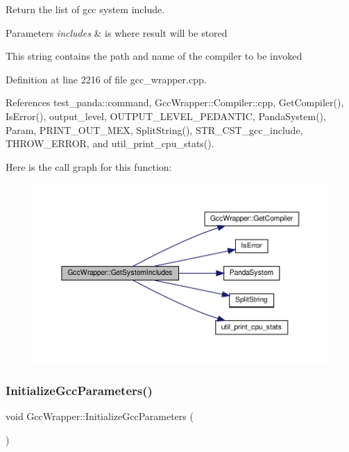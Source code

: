 Return the list of gcc system include. 


\begin{DoxyParams}{Parameters}
{\em includes} & is where result will be stored \\
\hline
\end{DoxyParams}
This string contains the path and name of the compiler to be invoked 

Definition at line 2216 of file gcc\+\_\+wrapper.\+cpp.



References test\+\_\+panda\+::command, Gcc\+Wrapper\+::\+Compiler\+::cpp, Get\+Compiler(), Is\+Error(), output\+\_\+level, O\+U\+T\+P\+U\+T\+\_\+\+L\+E\+V\+E\+L\+\_\+\+P\+E\+D\+A\+N\+T\+IC, Panda\+System(), Param, P\+R\+I\+N\+T\+\_\+\+O\+U\+T\+\_\+\+M\+EX, Split\+String(), S\+T\+R\+\_\+\+C\+S\+T\+\_\+gcc\+\_\+include, T\+H\+R\+O\+W\+\_\+\+E\+R\+R\+OR, and util\+\_\+print\+\_\+cpu\+\_\+stats().

Here is the call graph for this function\+:
\nopagebreak
\begin{figure}[H]
\begin{center}
\leavevmode
\includegraphics[width=350pt]{d4/dbf/classGccWrapper_a61564c5b5c0731306ac6e722d1826522_cgraph}
\end{center}
\end{figure}
\mbox{\label{classGccWrapper_a4a76e5df0a374c835ce31580a2da8c7a}} 
\subsubsection{\texorpdfstring{Initialize\+Gcc\+Parameters()}{InitializeGccParameters()}}
{\footnotesize\ttfamily void Gcc\+Wrapper\+::\+Initialize\+Gcc\+Parameters (\begin{DoxyParamCaption}{ }\end{DoxyParamCaption})\hspace{0.3cm}{\ttfamily [private]}}



